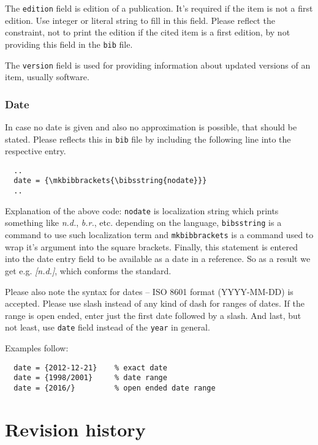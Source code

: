 \documentclass[a4paper,10pt]{ltxdockit}
\def\t|#1|{\texttt{#1}}
\begin{document}
The \t|edition| field is edition of a publication. It's required
if the item is not a first edition. Use integer or literal string
to fill in this field. Please reflect the constraint, not to print
the edition if the cited item is a first edition, by not providing
this field in the \t|bib| file.

The \t|version| field is used for providing information about
updated versions of an item, usually software.

\subsubsection{Date}

In case no date is given and also no approximation is possible, that
should be stated. Please reflects this in \t|bib| file by including
the following line into the respective entry.

\begin{verbatim}
  ..
  date = {\mkbibbrackets{\bibsstring{nodate}}}
  ..
\end{verbatim}

Explanation of the above code:
\t|nodate| is localization string which prints something like
\textit{n.d.}, \textit{b.r.}, etc. depending on the language,
\t|bibsstring| is a command to use such localization term and
\t|mkbibbrackets| is a command used to wrap it's argument into
the square brackets. Finally, this statement is entered into
the date entry field to be available as a date in a reference.
So as a result we get e.g. \textit{[n.d.]}, which conforms
the standard.

Please also note the syntax for dates -- ISO 8601 format
(YYYY-MM-DD) is accepted. Please use slash instead of
any kind of dash for ranges of dates. If the range is
open ended, enter just the first date followed by a slash.
And last, but not least, use \t|date| field instead of
the \t|year| in general.

Examples follow:

\begin{verbatim}
  date = {2012-12-21}    % exact date
  date = {1998/2001}     % date range
  date = {2016/}         % open ended date range
\end{verbatim}

\nocite{*}
\printbibliography[title={Reference bibliography},heading={bibnumbered}]


\section{Revision history}
\end{document}
